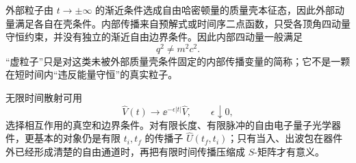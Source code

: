 外部粒子由 $t\to\pm\infty$ 的渐近条件选成自由哈密顿量的质量壳本征态，因此外部动量满足各自在壳条件。内部传播来自预解式或时间序二点函数，只受各顶角四动量守恒约束，并没有独立的渐近自由边界条件。因此内部四动量一般满足
\begin{equation*}
 q^2\neq m^2c^2.
\end{equation*}
“虚粒子”只是对这类未被外部质量壳条件固定的内部传播变量的简称；它不是一颗在短时间内“违反能量守恒”的真实粒子。

\begin{note}[$S$ 矩阵与有限时间传播]
无限时间散射可用
\begin{equation*}
 \hat V(t)\longrightarrow
 \ee^{-\epsilon|t|}\hat V,
 \qquad
 \epsilon\downarrow0,
\end{equation*}
选择相互作用的真空和边界条件。对有限长度、有限脉冲的自由电子量子光学器件，更基本的对象仍是有限 $t_i,t_f$ 的传播子 $\hat U(t_f,t_i)$；只有当入、出波包在器件外已经形成清楚的自由通道时，再把有限时间传播压缩成 $S$-矩阵才有意义。
\end{note}

